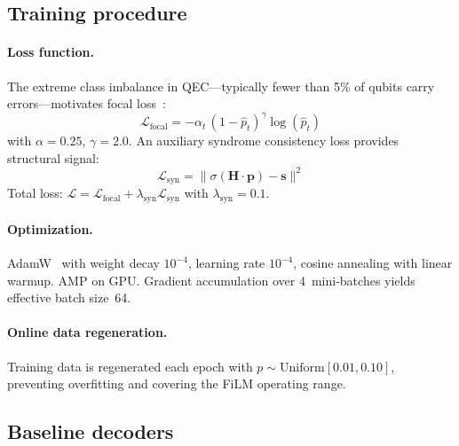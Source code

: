 \documentclass[a4paper,twocolumn,11pt,unpublished,nopdfoutputerror]{quantumarticle}
\newcommand{\synd}{\mathbf{s}}
\newcommand{\Hmat}{\mathbf{H}}
\newcommand{\bvec}[1]{\mathbf{#1}}
\begin{document}
\subsection{Training procedure}\label{sec:training}

\paragraph{Loss function.} The extreme class imbalance in QEC---typically fewer than 5\% of qubits carry errors---motivates focal loss~\cite{Lin2017Focal}:
\begin{equation}
\mathcal{L}_\mathrm{focal} = -\alpha_t\,(1-\hat{p}_t)^\gamma \log(\hat{p}_t)
\label{eq:focal}
\end{equation}
with $\alpha = 0.25$, $\gamma = 2.0$. An auxiliary syndrome consistency loss provides structural signal:
\begin{equation}
\mathcal{L}_\mathrm{syn} = \bigl\|\sigma(\Hmat \cdot \bvec{p}) - \synd\bigr\|^2
\label{eq:synloss}
\end{equation}
Total loss: $\mathcal{L} = \mathcal{L}_\mathrm{focal} + \lambda_\mathrm{syn} \mathcal{L}_\mathrm{syn}$ with $\lambda_\mathrm{syn} = 0.1$.

\paragraph{Optimization.} AdamW~\cite{Loshchilov2019AdamW} with weight decay $10^{-4}$, learning rate $10^{-4}$, cosine annealing with linear warmup. AMP on GPU. Gradient accumulation over 4~mini-batches yields effective batch size~64.

\paragraph{Online data regeneration.} Training data is regenerated each epoch with $p \sim \mathrm{Uniform}[0.01, 0.10]$, preventing overfitting and covering the FiLM operating range.

\subsection{Baseline decoders}\label{sec:baselines}
\end{document}
